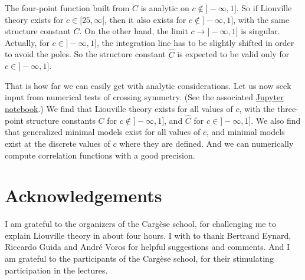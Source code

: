 \documentclass[12pt, a4paper]{article}
\theoremstyle{break}
\begin{document}
The four-point function built from $C$ is analytic on $c\notin ]-\infty,1]$. So if Liouville theory exists for $c\in [25,\infty[$, then it also exists for $c\notin ]-\infty,1]$, with the same structure constant $C$. 
On the other hand, the limit $c\to ]-\infty, 1]$ is singular. Actually, for $c\in ]-\infty, 1]$, the integration line has to be slightly shifted in order to avoid the poles. So the structure constant $\hat C$ is expected to be valid only for $c\in ]-\infty, 1]$.

That is how far we can easily get with analytic considerations. 
Let us now seek input from numerical tests of crossing symmetry. (See the associated \href{https://github.com/ribault/bootstrap-2d-Python/blob/master/Liouville_demo_2.ipynb}{Jupyter notebook}.)
We find that Liouville theory exists for all values of $c$, with the three-point structure constants $C$ for $c\notin ]-\infty,1]$, and $\hat C$ for $c\in ]-\infty, 1]$. 
We also find that generalized minimal models exist for all values of $c$, and minimal models exist at the discrete values of $c$ where they are defined. 
And we can numerically compute correlation functions with a good precision.

\section*{Acknowledgements}

I am grateful to the organizers of the Carg\`ese school, for challenging me to explain Liouville theory in about four hours.
I with to thank Bertrand Eynard, Riccardo Guida and Andr\'e Voros for helpful suggestions and comments.
And I am grateful to the participants of the Carg\`ese school, for their stimulating participation in the lectures.




%
\end{document}
